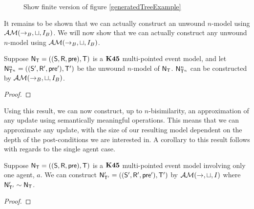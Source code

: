 \begin{figure}
\centering
\caption{\FIXME Show finite version of figure \ref{generatedTreeExample}} \label{genSubtreeExample}
\end{figure}

It remains to be shown that we can actually construct an unwound $n$-model using
$\mathcal{AM}(\to_B,\sqcup,I_B)$.
We will now show that we can actually construct any unwound $n$-model using $\mathcal{AM}(\to_B,
\sqcup, I_B)$.

\begin{lemma} \label{unwoundNModelGenerated}
  Suppose $\mathrm{\mathsf{N}}_\mathrm{\mathsf{T}} = ((\mathrm{\mathsf{S}},\mathrm{\mathsf{R}},\mathrm{\mathsf{pre}}),\mathrm{\mathsf{T}})$ is a $\bf K45$ multi-pointed
  event model, and let $\mathrm{\mathsf{N}}^n_{\mathrm{\mathsf{T}}^n} = ((\mathrm{\mathsf{S}}', \mathrm{\mathsf{R}}', \mathrm{\mathsf{pre}}'),\mathrm{\mathsf{T}}')$ be the
  unwound $n$-model of $\mathrm{\mathsf{N}}_\mathrm{\mathsf{T}}$.
  $\mathrm{\mathsf{N}}^n_{\mathrm{\mathsf{T}}^n}$ can be constructed by $\mathcal{AM}(\to_B, \sqcup, I_B)$.
\end{lemma}
\begin{proof}
\end{proof}

Using this result, we can now construct, up to $n$-bisimilarity, an
approximation of any update using semantically meaningful operations.
This means that we can approximate any update, with the size of our resulting
model dependent on the depth of the post-conditions we are interested in.
A corollary to this result follows with regards to the single agent case.

\begin{corr}
  Suppose $\mathrm{\mathsf{N}}_\mathrm{\mathsf{T}} = ((\mathrm{\mathsf{S}},\mathrm{\mathsf{R}},\mathrm{\mathsf{pre}}),\mathrm{\mathsf{T}})$ is a $\bf K45$ multi-pointed
  event model involving only one agent, $a$.
  We can construct $\mathrm{\mathsf{N}}'_{\mathrm{\mathsf{T}}'} = ((\mathrm{\mathsf{S}}',\mathrm{\mathsf{R}}',\mathrm{\mathsf{pre}}'),\mathrm{\mathsf{T}}')$ by
  $\mathcal{AM}(\to,\sqcup,I)$ where $\mathrm{\mathsf{N}}'_{\mathrm{\mathsf{T}}'} \sim \mathrm{\mathsf{N}}_\mathrm{\mathsf{T}}$.
\end{corr}
\begin{proof}
\end{proof}
